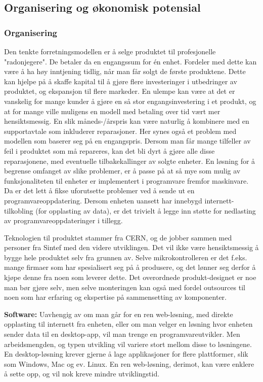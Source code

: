 \subsection{Organisering og økonomisk potensial}

\subsubsection{Organisering}

Den tenkte forretningsmodellen er å selge produktet til profesjonelle "radonjegere".
De betaler da en engangssum for én enhet.
Fordeler med dette kan være å ha høy inntjening tidlig, når man får solgt de første produktene.
Dette kan hjelpe på å skaffe kapital til å gjøre flere investeringer i utbedringer av produktet, og ekspansjon til flere markeder.
En ulempe kan være at det er vanskelig for mange kunder å gjøre en så stor engangsinvestering i et produkt, og at for mange ville muligens en modell med betaling over tid vært mer hensiktsmessig.
En slik måneds-/årspris kan være naturlig å kombinere med en supportavtale som inkluderer reparasjoner.
Her synes også et problem med modellen som baserer seg på en engangspris.
Dersom man får mange tilfeller av feil i produktet som må repareres, kan det bli dyrt å gjøre alle disse reparasjonene, med eventuelle tilbakekallinger av solgte enheter.
En løsning for å begrense omfanget av slike problemer, er å passe på at så mye som mulig av funksjonaliteten til enheter er implementert i programvare fremfor maskinvare.
Da er det lett å fikse uforutsette problemer ved å sende ut en programvareoppdatering.
Dersom enheten uansett har innebygd internett-tilkobling (for opplasting av data), er det trivielt å legge inn støtte for nedlasting av programvareoppdateringer i tillegg.

Teknologien til produktet stammer fra CERN, og de jobber sammen med personer fra Sintef med den videre utviklingen.
Det vil ikke være hensiktsmessig å bygge hele produktet selv fra grunnen av.
Selve mikrokontrolleren er det f.eks. mange firmaer som har spesialisert seg på å produsere, og det lønner seg derfor å kjøpe denne fra noen som leverer dette.
Det overordnede produkt-designet er noe man bør gjøre selv, men selve monteringen kan også med fordel outsources til noen som har erfaring og ekspertise på sammensetting av komponenter.

\textbf{Software:}
Uavhengig av om man går for en ren web-løsning, med direkte opplasting til internett fra enheten, eller om man velger en løsning hvor enheten sender data til en desktop-app, vil man trenge en programvareutvikler.
Men arbeidsmengden, og typen utvikling vil variere stort mellom disse to løsningene.
En desktop-løsning krever gjerne å lage applikasjoner for flere plattformer, slik som Windows, Mac og ev. Linux.
En ren web-løsning, derimot, kan være enklere å sette opp, og vil nok kreve mindre utviklingstid.

